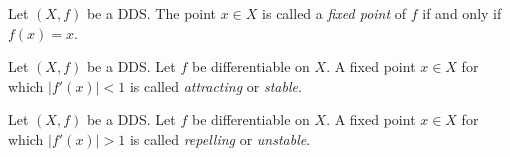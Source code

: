 \begin{definition}
\label{def:fixed point}
    Let $\left( X, f \right)$ be a DDS. The point $x \in X$ is called a \emph{fixed point} of $f$ if and only if $f(x) = x$.
\end{definition}

\begin{definition}
\label{def:sfp}
    Let $\left(X, f\right)$ be a DDS.
    Let $f$ be differentiable on $X$. 
    A fixed point $x \in X$ for which  $|f'(x)| < 1$ is called \emph{attracting} or \emph{stable}.
\end{definition}

\begin{definition}
\label{def:ufp}
    Let $\left(X, f\right)$ be a DDS.
    Let $f$ be differentiable on $X$. 
    A fixed point $x \in X$ for which $|f'(x)| > 1$ is called \emph{repelling} or \emph{unstable}.
\end{definition}

